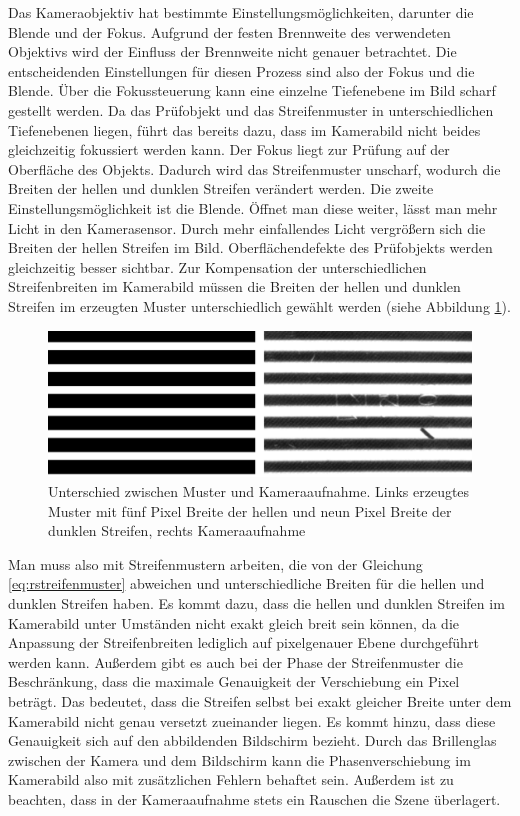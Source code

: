 Das Kameraobjektiv hat bestimmte Einstellungsmöglichkeiten, darunter die Blende und der Fokus.
Aufgrund der festen Brennweite des verwendeten Objektivs wird der Einfluss der Brennweite nicht genauer betrachtet.
Die entscheidenden Einstellungen für diesen Prozess sind also der Fokus und die Blende.
Über die Fokussteuerung kann eine einzelne Tiefenebene im Bild scharf gestellt werden.
Da das Prüfobjekt und das Streifenmuster in unterschiedlichen Tiefenebenen liegen, führt das bereits dazu, dass im Kamerabild nicht beides gleichzeitig fokussiert werden kann.
Der Fokus liegt zur Prüfung auf der Oberfläche des Objekts.
Dadurch wird das Streifenmuster unscharf, wodurch die Breiten der hellen und dunklen Streifen verändert werden.
Die zweite Einstellungsmöglichkeit ist die Blende.
Öffnet man diese weiter, lässt man mehr Licht in den Kamerasensor.
Durch mehr einfallendes Licht vergrößern sich die Breiten der hellen Streifen im Bild.
Oberflächendefekte des Prüfobjekts werden gleichzeitig besser sichtbar.
Zur Kompensation der unterschiedlichen Streifenbreiten im Kamerabild müssen die Breiten der hellen und dunklen Streifen im erzeugten Muster unterschiedlich gewählt werden (siehe Abbildung \ref{img:differenceCamPat}).

\begin{figure}[H]
	\centering
	\includegraphics[width=\textwidth]{03_sichtpruefungDurchLichtstreuung/optimierungen/unterschiedeKameraUndMonitor/figures/differenceCameraPattern}
	\caption[Unterschied zwischen Muster und Kameraaufnahme]{Unterschied zwischen Muster und Kameraaufnahme. Links erzeugtes Muster mit fünf Pixel Breite der hellen und neun Pixel Breite der dunklen Streifen, rechts Kameraaufnahme}
	\label{img:differenceCamPat}
\end{figure}

\noindent
Man muss also mit Streifenmustern arbeiten, die von der Gleichung \ref{eq:rstreifenmuster} abweichen und unterschiedliche Breiten für die hellen und dunklen Streifen haben.
Es kommt dazu, dass die hellen und dunklen Streifen im Kamerabild unter Umständen nicht exakt gleich breit sein können, da die Anpassung der Streifenbreiten lediglich auf pixelgenauer Ebene durchgeführt werden kann.
Außerdem gibt es auch bei der Phase der Streifenmuster die Beschränkung, dass die maximale Genauigkeit der Verschiebung ein Pixel beträgt.
Das bedeutet, dass die Streifen selbst bei exakt gleicher Breite unter dem Kamerabild nicht genau versetzt zueinander liegen.
Es kommt hinzu, dass diese Genauigkeit sich auf den abbildenden Bildschirm bezieht.
Durch das Brillenglas zwischen der Kamera und dem Bildschirm kann die Phasenverschiebung im Kamerabild also mit zusätzlichen Fehlern behaftet sein.
Außerdem ist zu beachten, dass in der Kameraaufnahme stets ein Rauschen die Szene überlagert.